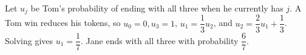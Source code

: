 Let $u_j$ be Tom's probability of ending with all three when he currently has $j$. A Tom win reduces his tokens, so $u_0=0,u_3=1$, $u_1=\dfrac{1}{3}u_2$, and $u_2=\dfrac{2}{3}u_1+\dfrac{1}{3}$. Solving gives $\boxed{u_1=\dfrac{1}{7}}$. Jane ends with all three with probability $\boxed{\dfrac{6}{7}}$.
